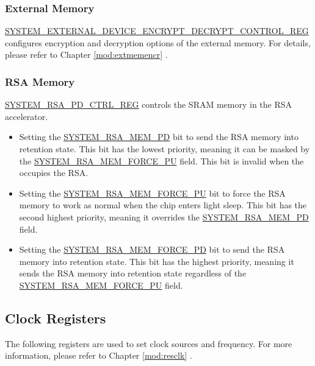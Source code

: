 \documentclass[main\_\_EN.tex]{subfiles}
\begin{document}
\subsubsection{External Memory}

\hyperref[regdesc:SYSTEMEXTERNALDEVICEENCRYPTDECRYPTCONTROLREG]{SYSTEM\_EXTERNAL\_DEVICE\_ENCRYPT\_DECRYPT\_CONTROL\_REG} configures encryption and decryption options of the external memory. For details, please refer to Chapter \ref{mod:extmemencr}
\textit{}.

\subsubsection{RSA Memory}

\hyperref[regdesc:SYSTEMRSAPDCTRLREG]{SYSTEM\_RSA\_PD\_CTRL\_REG} controls the SRAM memory in the RSA accelerator.

\begin{itemize}
    \item Setting the \hyperref[fielddesc:SYSTEMRSAMEMPD]{SYSTEM\_RSA\_MEM\_PD} bit to send the RSA memory into retention state. This bit has the lowest priority, meaning it can be masked by the \hyperref[fielddesc:SYSTEMRSAMEMFORCEPU]{SYSTEM\_RSA\_MEM\_FORCE\_PU} field. This bit is invalid when the \textit{} occupies the RSA.
    \item Setting the \hyperref[fielddesc:SYSTEMRSAMEMFORCEPU]{SYSTEM\_RSA\_MEM\_FORCE\_PU} bit to force the RSA memory to work as normal when the chip enters light sleep. This bit has the second highest priority, meaning it overrides the \hyperref[fielddesc:SYSTEMRSAMEMPD]{SYSTEM\_RSA\_MEM\_PD} field.
    \item Setting the \hyperref[fielddesc:SYSTEMRSAMEMFORCEPD]{SYSTEM\_RSA\_MEM\_FORCE\_PD} bit to send the RSA memory into retention state. This bit has the highest priority, meaning it sends the RSA memory into retention state regardless of the \hyperref[fielddesc:SYSTEMRSAMEMFORCEPU]{SYSTEM\_RSA\_MEM\_FORCE\_PU} field.
\end{itemize}

\subsection{Clock Registers}

The following registers are used to set clock sources and frequency. For more information, please refer to Chapter \ref{mod:resclk}
\textit{}.
\end{document}
